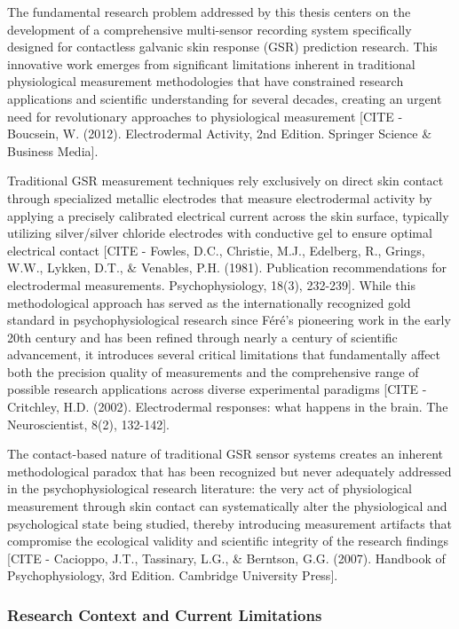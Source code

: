 \documentclass[11pt,a4paper]{report}
\begin{document}
The fundamental research problem addressed by this thesis centers on the development of a comprehensive multi-sensor
recording system specifically designed for contactless galvanic skin response (GSR) prediction research. This innovative
work emerges from significant limitations inherent in traditional physiological measurement methodologies that have
constrained research applications and scientific understanding for several decades, creating an urgent need for
revolutionary approaches to physiological
measurement [CITE - Boucsein, W. (2012). Electrodermal Activity, 2nd Edition. Springer Science \& Business Media].

Traditional GSR measurement techniques rely exclusively on direct skin contact through specialized metallic electrodes
that measure electrodermal activity by applying a precisely calibrated electrical current across the skin surface,
typically utilizing silver/silver chloride electrodes with conductive gel to ensure optimal electrical
contact [CITE - Fowles, D.C., Christie, M.J., Edelberg, R., Grings, W.W., Lykken, D.T., \& Venables, P.H. (1981). Publication recommendations for electrodermal measurements. Psychophysiology, 18(3), 232-239].
While this methodological approach has served as the internationally recognized gold standard in psychophysiological
research since Féré's pioneering work in the early 20th century and has been refined through nearly a century of
scientific advancement, it introduces several critical limitations that fundamentally affect both the precision quality
of measurements and the comprehensive range of possible research applications across diverse experimental
paradigms [CITE - Critchley, H.D. (2002). Electrodermal responses: what happens in the brain. The Neuroscientist, 8(2), 132-142].

The contact-based nature of traditional GSR sensor systems creates an inherent methodological paradox that has been
recognized but never adequately addressed in the psychophysiological research literature: the very act of physiological
measurement through skin contact can systematically alter the physiological and psychological state being studied,
thereby introducing measurement artifacts that compromise the ecological validity and scientific integrity of the
research
findings [CITE - Cacioppo, J.T., Tassinary, L.G., \& Berntson, G.G. (2007). Handbook of Psychophysiology, 3rd Edition. Cambridge University Press].

\subsubsection{Research Context and Current Limitations}
\end{document}
